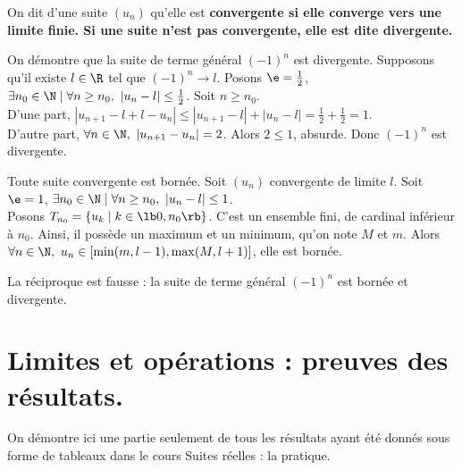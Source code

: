 \documentclass[11pt]{article}
\begin{document}
\begin{defi}{}{}
    On dit d'une suite $(u_n)$ qu'elle est \bf{convergente} si elle converge vers une limite finie. Si une suite n'est pas convergente, elle est dite \bf{divergente}.
\end{defi}

\begin{ex}{}{}
    On démontre que la suite de terme général $(-1)^n$ est divergente.
    \tcblower
    Supposons qu'il existe $l\in\R$ tel que $(-1)^n\to l$. Posons $\e=\frac{1}{2}$, $\exists n_0\in\N\mid\forall n\geq n_0, ~ |u_n-l|\leq \frac{1}{2}$. Soit $n\geq n_0$.\\
    D'une part, $|u_{n+1}-l+l-u_n|\leq|u_{n+1}-l|+|u_n-l|=\frac{1}{2}+\frac{1}{2}=1$.\\
    D'autre part, $\forall n \in \N, ~ |u_{n+1} - u_n| = 2$.
    Alors $2 \leq 1$, absurde. Donc $(-1)^n$ est divergente.
\end{ex}

\begin{prop}{}{}
    Toute suite convergente est bornée.
    \tcblower
    Soit $(u_n)$ convergente de limite $l$. Soit $\e=1$, $\exists n_0\in\N\mid\forall n\geq n_0, ~ |u_n-l|\leq 1$.\\
    Posons $T_{n_0}=\{u_k \mid k\in\lb0,n_0\rb\}$. C'est un ensemble fini, de cardinal inférieur à $n_0$. Ainsi, il possède un maximum et un minimum, qu'on note $M$ et $m$.
    Alors $\forall n \in \N, ~ u_n \in [\min(m,l-1), \max(M,l+1)]$, elle est bornée.
\end{prop}

La réciproque est fausse : la suite de terme général $(-1)^n$ est bornée et divergente.

\pagebreak

\section{Limites et opérations : preuves des résultats.}

\quad On démontre ici une partie seulement de tous les résultats ayant été donnés sous forme de tableaux dans le cours Suites réelles : la pratique.
\end{document}
